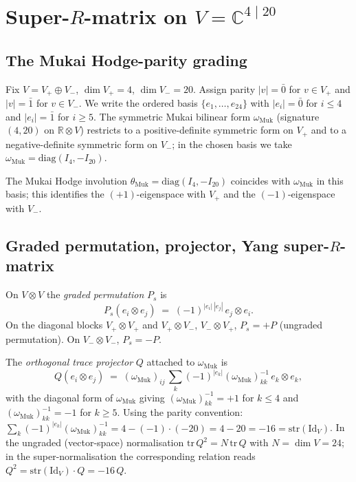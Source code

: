 \documentclass{article}
\providecommand{\C}{\mathbb C}
\providecommand{\R}{\mathbb R}
\providecommand{\Id}{\mathrm{Id}}
\providecommand{\str}{\mathrm{str}}
\theoremstyle{definition}
\begin{document}
\section{Super-$R$-matrix on $V = \C^{4 \mid 20}$}
\label{sec:r10-super-R}

\subsection{The Mukai Hodge-parity grading}

Fix $V = V_+ \oplus V_-$, $\dim V_+ = 4$, $\dim V_- = 20$. Assign
parity $|v| = \bar 0$ for $v \in V_+$ and $|v| = \bar 1$ for
$v \in V_-$. We write the ordered basis $\{e_1, \ldots, e_{24}\}$
with $|e_i| = \bar 0$ for $i \leq 4$ and $|e_i| = \bar 1$ for
$i \geq 5$. The symmetric Mukai bilinear form
$\omega_{\mathrm{Muk}}$ (signature $(4, 20)$ on $\R \otimes V$)
restricts to a positive-definite symmetric form on $V_+$ and to a
negative-definite symmetric form on $V_-$; in the chosen basis we
take $\omega_{\mathrm{Muk}} = \mathrm{diag}(I_4, -I_{20})$.

The Mukai Hodge involution
$\theta_{\mathrm{Muk}} = \mathrm{diag}(I_4, -I_{20})$ coincides with
$\omega_{\mathrm{Muk}}$ in this basis; this identifies the
$(+1)$-eigenspace with $V_+$ and the $(-1)$-eigenspace with $V_-$.

\subsection{Graded permutation, projector, Yang super-$R$-matrix}

On $V \otimes V$ the \emph{graded permutation} $P_s$ is
\begin{equation}\label{eq:r10-graded-permutation}
  P_s(e_i \otimes e_j)
  \;=\;
  (-1)^{|e_i|\,|e_j|}\, e_j \otimes e_i.
\end{equation}
On the diagonal blocks $V_+ \otimes V_+$ and $V_+ \otimes V_-$,
$V_- \otimes V_+$, $P_s = +P$ (ungraded permutation). On
$V_- \otimes V_-$, $P_s = -P$.

The \emph{orthogonal trace projector} $Q$ attached to
$\omega_{\mathrm{Muk}}$ is
\begin{equation}\label{eq:r10-projector-Q}
  Q(e_i \otimes e_j)
  \;=\;
  (\omega_{\mathrm{Muk}})_{ij}\, \sum_k (-1)^{|e_k|} (\omega_{\mathrm{Muk}})^{-1}_{kk}\, e_k \otimes e_k,
\end{equation}
with the diagonal form of $\omega_{\mathrm{Muk}}$ giving
$(\omega_{\mathrm{Muk}})^{-1}_{kk} = +1$ for $k \leq 4$ and
$(\omega_{\mathrm{Muk}})^{-1}_{kk} = -1$ for $k \geq 5$. Using the
parity convention: $\sum_k (-1)^{|e_k|} (\omega_{\mathrm{Muk}})^{-1}_{kk}
= 4 - (-1) \cdot (-20) = 4 - 20 = -16 = \str(\Id_V)$. In the
ungraded (vector-space) normalisation
$\mathrm{tr}\, Q^2 = N\, \mathrm{tr}\, Q$ with $N = \dim V = 24$; in
the super-normalisation the corresponding relation reads
$Q^2 = \str(\Id_V) \cdot Q = -16\, Q$.
\end{document}
